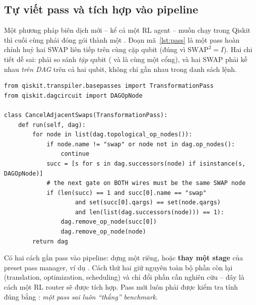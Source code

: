 \subsection{Tự viết pass và tích hợp vào pipeline}
\label{sec:custompass}

Một phương pháp biên dịch mới -- kể cả một RL agent -- muốn chạy trong Qiskit thì cuối cùng phải đóng
gói thành một . Đoạn mã~\ref{lst:pass} là một pass hoàn chỉnh huỷ hai SWAP
liên tiếp trên cùng cặp qubit (đúng vì $\mathrm{SWAP}^2 = I$). Hai chi tiết dễ sai: phải so sánh
\emph{tập} qubit ( và  là cùng một cổng), và hai SWAP phải kề nhau
\emph{trên DAG} trên cả hai qubit, không chỉ gần nhau trong danh sách lệnh.

\begin{lstlisting}[caption={Một \code{TransformationPass} huỷ các cặp SWAP kề nhau trên DAG.}, label={lst:pass}]
from qiskit.transpiler.basepasses import TransformationPass
from qiskit.dagcircuit import DAGOpNode

class CancelAdjacentSwaps(TransformationPass):
    def run(self, dag):
        for node in list(dag.topological_op_nodes()):
            if node.name != "swap" or node not in dag.op_nodes():
                continue
            succ = [s for s in dag.successors(node) if isinstance(s, DAGOpNode)]
            # the next gate on BOTH wires must be the same SWAP node
            if (len(succ) == 1 and succ[0].name == "swap"
                    and set(succ[0].qargs) == set(node.qargs)
                    and len(list(dag.successors(node))) == 1):
                dag.remove_op_node(succ[0])
                dag.remove_op_node(node)
        return dag
\end{lstlisting}

Có hai cách gắn pass vào pipeline: dựng một  riêng, hoặc \textbf{thay một
stage} của preset pass manager, ví dụ . Cách thứ hai
giữ nguyên toàn bộ phần còn lại (translation, optimization, scheduling) và chỉ đổi phần cần nghiên cứu
-- đây là cách một RL router sẽ được tích hợp. Pass mới luôn phải được kiểm tra tính đúng bằng
: \emph{một pass sai luôn ``thắng'' benchmark}.
